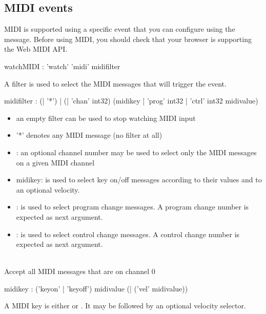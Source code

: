 \documentclass[a4paper,twoside]{article}
\newcommand{\sublevel}[1]	{\subsection{#1}}
\begin{document}
\example
{}


\sublevel{MIDI events}
\label{MIDIEvents}


MIDI is supported using a specific event that you can configure using the  message. Before using MIDI, you should check that your browser is supporting the Web MIDI API.

\begin{rail}
watchMIDI : 'watch' 'midi' midifilter
\end{rail}
A filter is used to select the MIDI messages that will trigger the event.

\begin{rail}
midifilter : (| '*')
			 | (| 'chan' int32) 
			 (midikey | 'prog' int32 | 'ctrl' int32 midivalue)
\end{rail}

\begin{itemize}
\item an empty filter can be used to stop watching MIDI input
\item '*' denotes any MIDI message (no filter at all)
\item {}: an optional channel number may be used to select only the MIDI messages on a given MIDI channel
\item midikey: is used to select key on/off messages according to their values and to an optional velocity.
\item {}: is used to select program change messages. A program change number is expected as next argument.
\item {}: is used to select control change messages. A control change number is expected as next argument.
\end{itemize}

\example\\
Accept all MIDI messages that are on channel 0

\begin{rail}
midikey : 
			 ('keyon' | 'keyoff') midivalue (| ('vel' midivalue))
\end{rail}

A MIDI key is either  or . It may be followed by an optional velocity selector.
\end{document}
